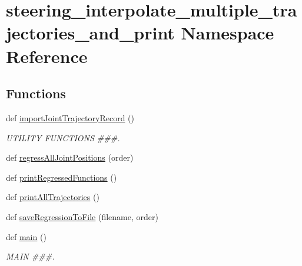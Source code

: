 \hypertarget{namespacesteering__interpolate__multiple__trajectories__and__print}{}\section{steering\+\_\+interpolate\+\_\+multiple\+\_\+trajectories\+\_\+and\+\_\+print Namespace Reference}
\label{namespacesteering__interpolate__multiple__trajectories__and__print}
\subsection*{Functions}
\begin{DoxyCompactItemize}
\item 
def \mbox{\hyperlink{namespacesteering__interpolate__multiple__trajectories__and__print_a5ecaa1f0c7b7379d5d217b69ecbcfafc}{import\+Joint\+Trajectory\+Record}} ()
\begin{DoxyCompactList}\small\item\em U\+T\+I\+L\+I\+TY F\+U\+N\+C\+T\+I\+O\+NS \#\#\#. \end{DoxyCompactList}\item 
def \mbox{\hyperlink{namespacesteering__interpolate__multiple__trajectories__and__print_a455bf7b19b802ee191ffab2ea68b89ff}{regress\+All\+Joint\+Positions}} (order)
\item 
def \mbox{\hyperlink{namespacesteering__interpolate__multiple__trajectories__and__print_ac37d0b266a32494874d9f5bb5572cded}{print\+Regressed\+Functions}} ()
\item 
def \mbox{\hyperlink{namespacesteering__interpolate__multiple__trajectories__and__print_a77eaba3dfeff8bad51d43bd0d6304fbc}{print\+All\+Trajectories}} ()
\item 
def \mbox{\hyperlink{namespacesteering__interpolate__multiple__trajectories__and__print_abd864bec2616f889e72f950898521b8b}{save\+Regression\+To\+File}} (filename, order)
\item 
def \mbox{\hyperlink{namespacesteering__interpolate__multiple__trajectories__and__print_a17184534fa48653e3e1957dd8fe17257}{main}} ()
\begin{DoxyCompactList}\small\item\em M\+A\+IN \#\#\#. \end{DoxyCompactList}\end{DoxyCompactItemize}
